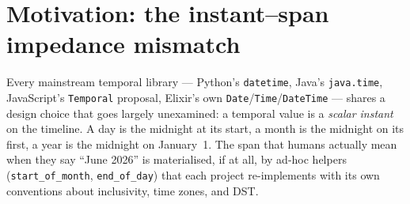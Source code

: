 \maketitle

\begin{abstract}
  Mainstream programming languages model temporal values as scalar
  instants: a \texttt{Date} is a point, a \texttt{DateTime} is a point,
  and a partial value such as ``June 2026'' has no canonical
  representation at all. Yet the temporal values that humans, calendars,
  and business logic actually manipulate are spans on the timeline ---
  the year 2026, the afternoon of the 15th, an archaeological period,
  a meeting. Tempo is an Elixir library that reverses the polarity:
  every temporal value is a bounded half-open interval at a declared
  resolution, set-theoretic combination is closed under that type, and
  comparison is defined by Allen's thirteen relations rather than by
  scalar ordering. The result eliminates an entire class of off-by-one
  and ``end-of-day'' bugs by construction, gives partial ISO~8601
  values (\texttt{2026}, \texttt{2026-06}, \texttt{2026-06-XX}) an
  unambiguous denotational semantics, and lifts Allen's algebra from a
  textbook abstraction to an everyday predicate vocabulary
  (\texttt{overlaps?}, \texttt{within?}, \texttt{adjacent?}). This
  extended abstract describes the conceptual model, the unification of
  partial dates with explicit intervals, and the design of set
  operations over intervals and interval sets that is the library's
  current focus.
\end{abstract}

\section{Motivation: the instant--span impedance mismatch}

Every mainstream temporal library --- Python's \texttt{datetime}, Java's
\texttt{java.time}, JavaScript's \texttt{Temporal} proposal, Elixir's
own \texttt{Date}/\texttt{Time}/\texttt{DateTime} --- shares a design
choice that goes largely unexamined: a temporal value is a
\emph{scalar instant} on the timeline. A day is the midnight at its
start, a month is the midnight on its first, a year is the midnight
on January~1. The span that humans actually mean when they say ``June
2026'' is materialised, if at all, by ad-hoc helpers
(\texttt{start\_of\_month}, \texttt{end\_of\_day}) that each project
re-implements with its own conventions about inclusivity, time zones,
and DST.


